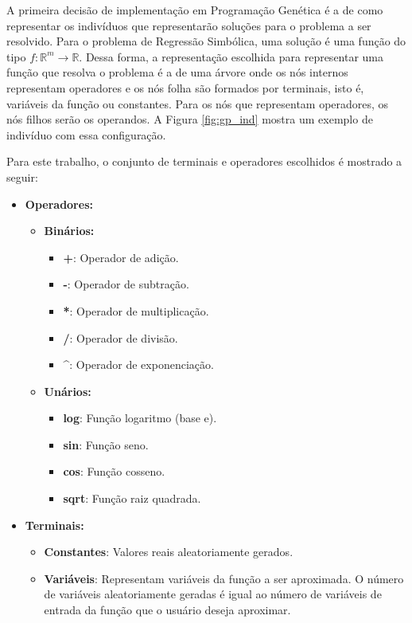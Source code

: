 \documentclass[12pt]{article}
\begin{document}
A primeira decisão de implementação em Programação Genética é a de como representar
os indivíduos que representarão soluções para o problema a ser resolvido. Para o
problema de Regressão Simbólica, uma solução é uma função do tipo
$ f:\mathbb{R}^{m} \rightarrow \mathbb{R} $. Dessa forma, a representação escolhida
para representar uma função que resolva o problema é a de uma árvore onde os nós
internos representam operadores e os nós folha são formados por terminais, isto é,
variáveis da função ou constantes. Para os nós que representam operadores, os nós filhos
serão os operandos. A Figura \ref{fig:gp_ind} mostra um exemplo de indivíduo com essa
configuração.

Para este trabalho, o conjunto de terminais e operadores escolhidos é mostrado a seguir:

\begin{itemize}
 \item \textbf{Operadores:}
 \begin{itemize}
  \item \textbf{Binários:}
   \begin{itemize}
    \item \textbf{+}: Operador de adição.
    \item \textbf{-}: Operador de subtração.
    \item \textbf{*}: Operador de multiplicação.
    \item \textbf{/}: Operador de divisão.
    \item \textbf{\^}: Operador de exponenciação.
   \end{itemize}
   
   \item \textbf{Unários:}
   \begin{itemize}
    \item \textbf{log}: Função logaritmo (base e).
    \item \textbf{sin}: Função seno.
    \item \textbf{cos}: Função cosseno.
    \item \textbf{sqrt}: Função raiz quadrada.
   \end{itemize}

 \end{itemize}
 
 \item \textbf{Terminais:}
 \begin{itemize}
  \item \textbf{Constantes}: Valores reais aleatoriamente gerados.
  \item \textbf{Variáveis}: Representam variáveis da função a ser aproximada.
  O número de variáveis aleatoriamente geradas é igual ao número de variáveis
  de entrada da função que o usuário deseja aproximar.
 \end{itemize}
 
\end{itemize}
\end{document}
